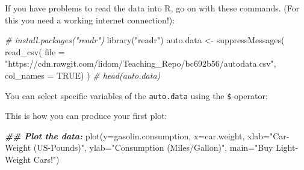\documentclass[
  14pt,
]{memoir}
\newenvironment{Shaded}{\begin{snugshade}}{\end{snugshade}}
\newcommand{\AttributeTok}[1]{\textcolor[rgb]{0.77,0.63,0.00}{#1}}
\newcommand{\CommentTok}[1]{\textcolor[rgb]{0.56,0.35,0.01}{\textit{#1}}}
\newcommand{\ConstantTok}[1]{\textcolor[rgb]{0.00,0.00,0.00}{#1}}
\newcommand{\DocumentationTok}[1]{\textcolor[rgb]{0.56,0.35,0.01}{\textbf{\textit{#1}}}}
\newcommand{\FunctionTok}[1]{\textcolor[rgb]{0.00,0.00,0.00}{#1}}
\newcommand{\NormalTok}[1]{#1}
\newcommand{\OtherTok}[1]{\textcolor[rgb]{0.56,0.35,0.01}{#1}}
\newcommand{\SpecialCharTok}[1]{\textcolor[rgb]{0.00,0.00,0.00}{#1}}
\newcommand{\StringTok}[1]{\textcolor[rgb]{0.31,0.60,0.02}{#1}}
\begin{document}
\hfill\break

If you have problems to read the data into R, go on with these commands. (For this you need a working internet connection!):

\begin{Shaded}
\begin{Highlighting}[]
\CommentTok{\# install.packages("readr")}
\FunctionTok{library}\NormalTok{(}\StringTok{"readr"}\NormalTok{)}
\NormalTok{auto.data }\OtherTok{\textless{}{-}} \FunctionTok{suppressMessages}\NormalTok{(}
  \FunctionTok{read\_csv}\NormalTok{(}
  \AttributeTok{file =} \StringTok{"https://cdn.rawgit.com/lidom/Teaching\_Repo/bc692b56/autodata.csv"}\NormalTok{,}
  \AttributeTok{col\_names =} \ConstantTok{TRUE}\NormalTok{)}
\NormalTok{)}
\CommentTok{\# head(auto.data)}
\end{Highlighting}
\end{Shaded}

\hfill\break

You can select specific variables of the \texttt{auto.data} using the \texttt{\$}-operator:

\begin{Shaded}
\end{Shaded}

\hfill\break

This is how you can produce your first plot:

\begin{Shaded}
\begin{Highlighting}[]
\DocumentationTok{\#\# Plot the data:}
\FunctionTok{plot}\NormalTok{(}\AttributeTok{y=}\NormalTok{gasolin.consumption, }\AttributeTok{x=}\NormalTok{car.weight, }
     \AttributeTok{xlab=}\StringTok{"Car{-}Weight (US{-}Pounds)"}\NormalTok{, }
     \AttributeTok{ylab=}\StringTok{"Consumption (Miles/Gallon)"}\NormalTok{, }
     \AttributeTok{main=}\StringTok{"Buy Light{-}Weight Cars!"}\NormalTok{)}
\end{Highlighting}
\end{Shaded}
\end{document}
